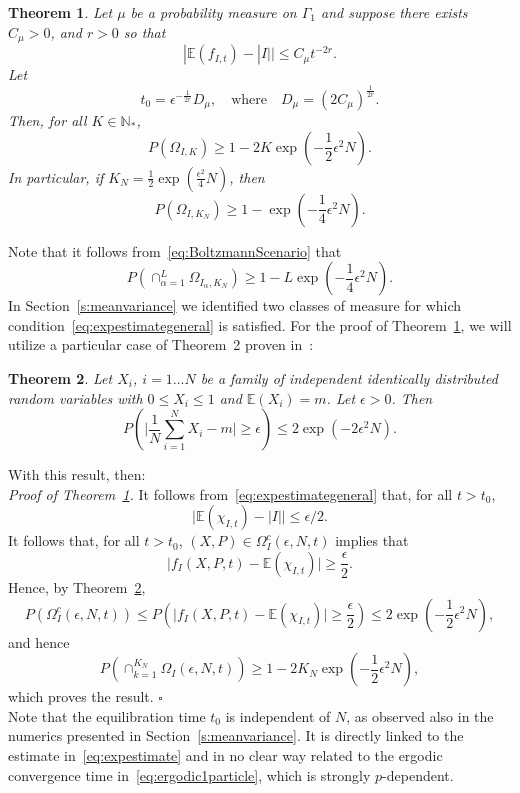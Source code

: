 \documentclass{article}
\newcommand {\E}{\mathbb{E}}
\newcommand {\N}{\mathbb{N}}
\newtheorem{theorem}{Theorem}[section]
\numberwithin{equation}{section}
\begin{document}
\begin{theorem}\label{thm:gasexpansion}
Let $\mu$ be a probability measure on $\Gamma_1$  and suppose there exists $C_\mu>0$,
and $r>0$ so that
\begin{equation}\label{eq:expestimategeneral}
|\E(f_{I,t})-|I||\leq C_\mu t^{-2r}.
\end{equation}
Let $$
t_0=\epsilon^{-\frac1{2r}} D_\mu,\quad\mathrm{where}\quad D_\mu=\left(2C_\mu\right)^{\frac1{2r}}.
$$
Then, for all $K\in\N_*$,
$$
P(\Omega_{I,K})\geq 1-2K\exp(-\frac12\epsilon^2N).
$$
In particular, if $K_N=\frac12\exp(\frac{\epsilon^2}{4}N)$, then
\begin{equation}\label{eq:BoltzmannScenario}
P(\Omega_{I, K_N})\geq 1-\exp(-\frac14\epsilon^2N).
\end{equation}
\end{theorem}
Note that it follows from~\eqref{eq:BoltzmannScenario} that
\begin{equation}\label{eq:BoltzmannScenariobis}
P(\cap_{\alpha=1}^L\Omega_{I_\alpha, K_N})\geq 1-L\exp(-\frac14\epsilon^2N).
\end{equation}
In Section~\ref{s:meanvariance} we identified two classes of measure for which condition~\eqref{eq:expestimategeneral} is satisfied.
For the proof of Theorem~\ref{thm:gasexpansion}, we will utilize a particular case of Theorem~2 proven in~\cite{Ho63}:
\begin{theorem}\label{thm:largedev} Let $X_i$, $i=1\dots N$ be a family of independent identically distributed random variables
with $0\leq X_i\leq 1$ and $\E(X_i)=m$. Let $\epsilon>0$. Then
$$
P(\mid \frac1N\sum_{i=1}^N X_i-m\mid\geq \epsilon)\leq 2\exp(-2\epsilon^2N).
$$
\end{theorem}
\noindent With this result, then:\\
{\em Proof of Theorem~\ref{thm:gasexpansion}.} It follows from~\eqref{eq:expestimategeneral} that,
 for all $t>t_0$,
 $$
\mid \E(\chi_{I,t})-|I|\mid\leq \epsilon/2.
$$
It follows that, for all $t>t_0$, $(X,P)\in\Omega_I^c(\epsilon, N, t)$ implies that
$$
\mid f_I(X,P,t)-\E(\chi_{I,t})\mid\geq \frac\epsilon2.
$$
Hence, by Theorem~\ref{thm:largedev},
\begin{equation}\label{eq:estimatefixed_t}
P(\Omega_I^c(\epsilon, N, t))\leq P\left(\mid f_I(X,P,t)-\E(\chi_{I,t})\mid\geq \frac\epsilon2\right)\leq 2\exp(-\frac12\epsilon^2N),
\end{equation}
and hence
\begin{equation}\label{eq:P(good)}
P(\cap_{k=1}^{K_N}\Omega_I(\epsilon, N, t))\geq 1- 2K_N\exp(-\frac12\epsilon^2N),
\end{equation}
which proves the result.
{\hfill\ensuremath{\square}}\\
Note that the equilibration time $t_0$ is independent of $N$, as observed also in the numerics presented in Section~\ref{s:meanvariance}. It is directly linked to the estimate in~\eqref{eq:expestimate} and in no clear way related to the ergodic convergence time in~\eqref{eq:ergodic1particle}, which is strongly $p$-dependent.
\end{document}
